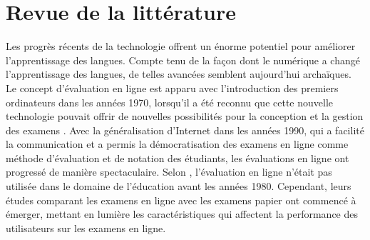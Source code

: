 \documentclass[french]{textolivre}
\begin{document}
\section{Revue de la littérature}

Les progrès récents de la technologie offrent un énorme potentiel pour améliorer l'apprentissage des langues. Compte tenu de la façon dont le numérique a changé l’apprentissage des langues, de telles avancées semblent aujourd'hui archaïques. Le concept d'évaluation en ligne est apparu avec l'introduction des premiers ordinateurs dans les années 1970, lorsqu'il a été reconnu que cette nouvelle technologie pouvait offrir de nouvelles possibilités pour la conception et la gestion des examens \cite{cwil2019teacher}. Avec la généralisation d'Internet dans les années 1990, qui a facilité la communication et a permis la démocratisation des examens en ligne comme méthode d'évaluation et de notation des étudiants, les évaluations en ligne ont progressé de manière spectaculaire. Selon \textcite{russell_computer-based_2003}, l’évaluation en ligne n’était pas utilisée dans le domaine de l'éducation avant les années 1980. Cependant, leurs études comparant les examens en ligne avec les examens papier ont commencé à émerger, mettant en lumière les caractéristiques qui affectent la performance des utilisateurs sur les examens en ligne.
\end{document}
